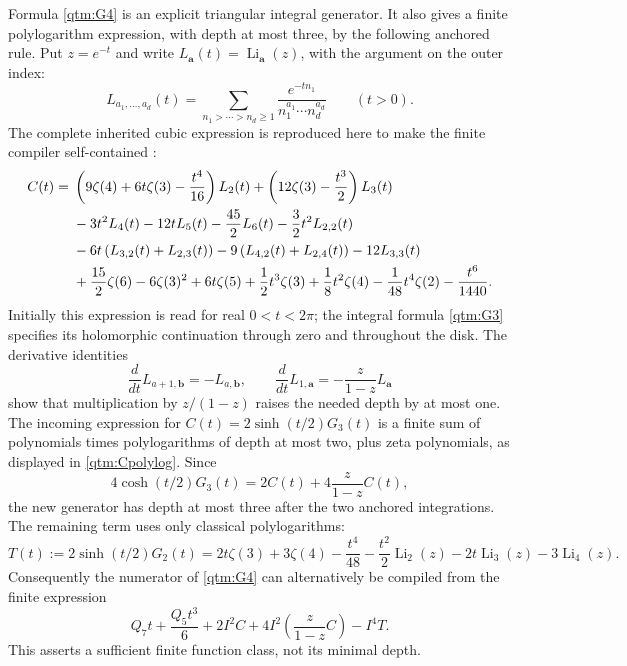 Formula \eqref{qtm:G4} is an explicit triangular integral generator.
It also gives a finite polylogarithm expression, with depth at most three,
by the following anchored rule.  Put $z=e^{-t}$ and write
$L_{\boldsymbol a}(t)=\operatorname{Li}_{\boldsymbol a}(z)$, with
the argument on the outer index:
\[
 L_{a_1,\ldots,a_d}(t)
   =\sum_{n_1>\cdots>n_d\ge1}
        \frac{e^{-tn_1}}{n_1^{a_1}\cdots n_d^{a_d}}\qquad(t>0).
\]
The complete inherited cubic expression is reproduced here to make
the finite compiler self-contained
\cite[Section 6, finite depth-two generator]{Reconstruction}:
\begin{align}
 C(t)={}&
 \left(9\zeta(4)+6t\zeta(3)-\frac{t^4}{16}\right)L_2(t)
 +\left(12\zeta(3)-\frac{t^3}{2}\right)L_3(t)
       \notag\\
 &-3t^2L_4(t)-12tL_5(t)-\frac{45}{2}L_6(t)
       -\frac32t^2L_{2,2}(t)
       \notag\\
 &-6t\left(L_{3,2}(t)+L_{2,3}(t)\right)
       -9\left(L_{4,2}(t)+L_{2,4}(t)\right)-12L_{3,3}(t)
       \notag\\
 &+\frac{15}{2}\zeta(6)-6\zeta(3)^2+6t\zeta(5)
       +\frac12t^3\zeta(3)+\frac18t^2\zeta(4)
       -\frac1{48}t^4\zeta(2)-\frac{t^6}{1440}.
 \label{qtm:Cpolylog}
\end{align}
Initially this expression is read for real $0<t<2\pi$; the integral
formula \eqref{qtm:G3} specifies its holomorphic continuation through
zero and throughout the disk.  The derivative identities
\[
 \frac d{dt}L_{a+1,\boldsymbol b}=-L_{a,\boldsymbol b},\qquad
 \frac d{dt}L_{1,\boldsymbol a}
       =-\frac{z}{1-z}L_{\boldsymbol a}
\]
show that multiplication by $z/(1-z)$ raises the needed depth by at
most one.  The incoming expression for
$C(t)=2\sinh(t/2)G_3(t)$ is a finite sum of polynomials times
polylogarithms of depth at most two, plus zeta polynomials, as displayed
in \eqref{qtm:Cpolylog}.  Since
\[
 4\cosh(t/2)G_3(t)=2C(t)+4\frac{z}{1-z}C(t),
\]
the new generator has depth at most three after the two anchored
integrations.  The remaining term uses only classical polylogarithms:
\begin{equation}\label{qtm:Tpolylog}
 T(t):=2\sinh(t/2)G_2(t)
 =2t\zeta(3)+3\zeta(4)-\frac{t^4}{48}
   -\frac{t^2}{2}\operatorname{Li}_2(z)
   -2t\operatorname{Li}_3(z)-3\operatorname{Li}_4(z).
\end{equation}
Consequently the numerator of \eqref{qtm:G4} can alternatively be
compiled from the finite expression
\begin{equation}\label{qtm:finitecompiler}
 Q_7t+\frac{Q_5t^3}{6}+2I^2C
       +4I^2\left(\frac{z}{1-z}C\right)-I^4T.
\end{equation}
This asserts a sufficient finite function class, not its minimal depth.


